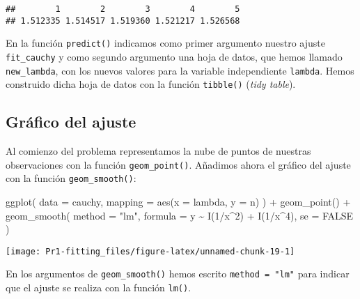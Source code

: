\documentclass[
  degree=mecinf,
  title=normal,
  toc=normal,
  bib=normal]{mnye}
\newenvironment{Shaded}{\begin{snugshade}}{\end{snugshade}}
\newcommand{\AttributeTok}[1]{\textcolor[rgb]{0.77,0.63,0.00}{#1}}
\newcommand{\ConstantTok}[1]{\textcolor[rgb]{0.00,0.00,0.00}{#1}}
\newcommand{\DecValTok}[1]{\textcolor[rgb]{0.00,0.00,0.81}{#1}}
\newcommand{\FunctionTok}[1]{\textcolor[rgb]{0.00,0.00,0.00}{#1}}
\newcommand{\NormalTok}[1]{#1}
\newcommand{\SpecialCharTok}[1]{\textcolor[rgb]{0.00,0.00,0.00}{#1}}
\newcommand{\StringTok}[1]{\textcolor[rgb]{0.31,0.60,0.02}{#1}}
\begin{document}
\begin{verbatim}
##        1        2        3        4        5 
## 1.512335 1.514517 1.519360 1.521217 1.526568
\end{verbatim}

En la función \texttt{predict()} indicamos como primer argumento nuestro ajuste \texttt{fit\_cauchy} y como segundo argumento una hoja de datos, que hemos llamado \texttt{new\_lambda}, con los nuevos valores para la variable independiente \texttt{lambda}. Hemos construido dicha hoja de datos con la función \texttt{tibble()} (\emph{tidy table}).

\hypertarget{gruxe1fico-del-ajuste}{%
\subsection{Gráfico del ajuste}\label{gruxe1fico-del-ajuste}}

Al comienzo del problema representamos la nube de puntos de nuestras observaciones con la función \texttt{geom\_point()}. Añadimos ahora el gráfico del ajuste con la función \texttt{geom\_smooth()}:

\begin{Shaded}
\begin{Highlighting}[]
\FunctionTok{ggplot}\NormalTok{(}
    \AttributeTok{data =}\NormalTok{ cauchy, }
    \AttributeTok{mapping =} \FunctionTok{aes}\NormalTok{(}\AttributeTok{x =}\NormalTok{ lambda, }\AttributeTok{y =}\NormalTok{ n)}
\NormalTok{) }\SpecialCharTok{+} 
    \FunctionTok{geom\_point}\NormalTok{() }\SpecialCharTok{+} 
    \FunctionTok{geom\_smooth}\NormalTok{(}
        \AttributeTok{method =} \StringTok{"lm"}\NormalTok{,}
        \AttributeTok{formula =}\NormalTok{ y }\SpecialCharTok{\textasciitilde{}} \FunctionTok{I}\NormalTok{(}\DecValTok{1}\SpecialCharTok{/}\NormalTok{x}\SpecialCharTok{\^{}}\DecValTok{2}\NormalTok{) }\SpecialCharTok{+} \FunctionTok{I}\NormalTok{(}\DecValTok{1}\SpecialCharTok{/}\NormalTok{x}\SpecialCharTok{\^{}}\DecValTok{4}\NormalTok{),}
        \AttributeTok{se =} \ConstantTok{FALSE}
\NormalTok{    ) }
\end{Highlighting}
\end{Shaded}

\begin{center}\texttt{[image: Pr1-fitting\_files/figure-latex/unnamed-chunk-19-1]} \end{center}

En los argumentos de \texttt{geom\_smooth()} hemos escrito \texttt{method\ =\ "lm"} para indicar que el ajuste se realiza con la función \texttt{lm()}.
\end{document}
